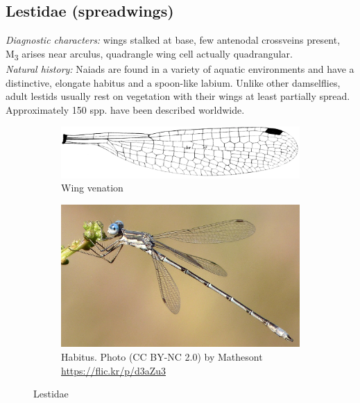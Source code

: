 \documentclass[letterpaper, 11pt]{article}
\begin{document}
\subsection{Lestidae (spreadwings)}
\noindent{}\textit{Diagnostic characters:} wings stalked at base, few antenodal crossveins present, \texorpdfstring{M\textsubscript{3}}{ }{ } arises near arculus, quadrangle wing cell actually quadrangular. \\

\noindent{}\textit{Natural history:} Naiads are found in a variety of aquatic environments and have a distinctive, elongate habitus and a spoon-like labium. Unlike other damselflies, adult lestids usually rest on vegetation with their wings at least partially spread. Approximately 150 spp. have been described worldwide.\\ 

\begin{figure}[ht!]
    \centering
    \begin{subfigure}[ht!]{0.45\textwidth}
        \includegraphics[width=\textwidth]{LestidWing}
        \caption{Wing venation \citep[][Fig. 232]{comstock1918wings}}
        \label{fig:lestwing}
    \end{subfigure}
    \hfill
    \begin{subfigure}[ht!]{0.45\textwidth}
        \includegraphics[width=\textwidth]{LestidHabitus}
        \caption{Habitus. Photo (CC BY-NC 2.0) by Mathesont \url{https://flic.kr/p/d3aZu3}}
        \label{fig:lestbody}
    \end{subfigure}
    \caption{Lestidae}\label{fig:lestid}
\end{figure}
\end{document}
